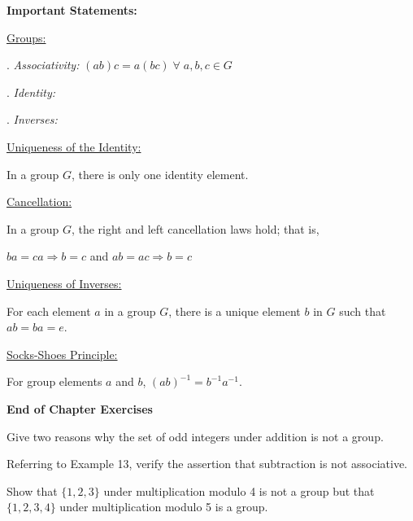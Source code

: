 \documentclass[11pt,largemargins]{homework}
\begin{document}
\maketitle

\textbf{\large{Important Statements:}}

\underline{Groups:}

. \textit{Associativity:} $(ab)c=a(bc) \;\forall\;a,b,c \in G$

. \textit{Identity:}

. \textit{Inverses:}

\underline{Uniqueness of the Identity:}

\quad In a group $G$, there is only one identity element.

\underline{Cancellation:}

\quad In a group $G$, the right and left cancellation laws hold; that is, 

\quad $ba=ca \Rightarrow b=c$ and $ab=ac \Rightarrow b=c$

\underline{Uniqueness of Inverses:}

\quad For each element $a$ in a group $G$, there is a unique element $b$ in $G$ such that $ab=ba=e$.

\underline{Socks-Shoes Principle:}

\quad For group elements $a$ and $b$, $(ab)^{-1}=b^{-1}a^{-1}$.

\hfill

\textbf{\large{End of Chapter Exercises}}

\question
Give two reasons why the set of odd integers under addition is not a group.

\question
Referring to Example 13, verify the assertion that subtraction is not associative.


\question
Show that $\{1, 2, 3\}$ under multiplication modulo 4 is not a group but that $\{1,2,3,4\}$ under multiplication 
modulo 5 is a group.
\end{document}
